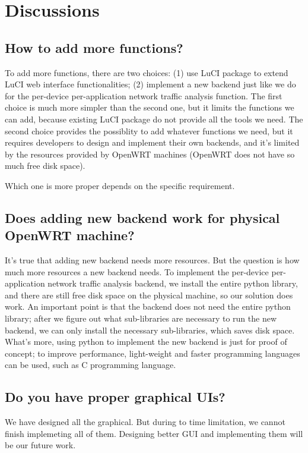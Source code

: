 \section{Discussions}

\subsection{How to add more functions?}
To add more functions, there are two choices: (1) use LuCI package to extend LuCI web interface functionalities; (2) implement a new backend just like we do for the per-device per-application network traffic analysis function. The first choice is much more simpler than the second one, but it limits the functions we can add, because existing LuCI package do not provide all the tools we need. The second choice provides the possiblity to add whatever functions we need, but it requires developers to design and implement their own backends, and it's limited by the resources provided by OpenWRT machines (OpenWRT does not have so much free disk space).

Which one is more proper depends on the specific requirement.
\subsection{Does adding new backend work for physical OpenWRT machine?}
It's true that adding new backend needs more resources. But the question is how much more resources a new backend needs. To implement the  per-device per-application network traffic analysis backend, we install the entire python library, and there are still free disk space on the physical machine, so our solution does work. An important point is that the backend does not need the entire python library; after we figure out what sub-libraries are necessary to run the new backend, we can only install the necessary sub-libraries, which saves disk space. What's more, using python to implement the new backend is just for proof of concept; to improve performance, light-weight and faster programming languages can be used, such as C programming language.

\subsection{Do you have proper graphical UIs?}
We have designed all the graphical. But during to time limitation, we cannot finish implemeting all of them. Designing better GUI and implementing them will be our future work.